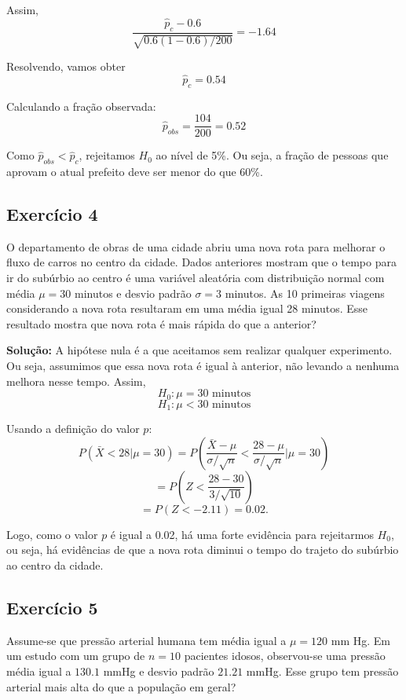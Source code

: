\documentclass{article}
\begin{document}
Assim,
    $$
    \frac{\hat{p}_c - 0.6}{\sqrt{0.6(1-0.6)/200}} = -1.64
    $$

Resolvendo, vamos obter 
    $$
    \hat{p}_c = 0.54
    $$
    
Calculando a fração observada:
    $$
    \hat{p}_{obs} = \frac{104}{200} = 0.52
    $$

Como $\hat{p}_{obs} < \hat{p}_c$, rejeitamos $H_0$ ao nível de 5\%. Ou seja, a fração de pessoas que aprovam o atual prefeito deve ser menor do que 60\%.

\subsection{Exercício 4}
O departamento de obras de uma cidade abriu uma nova rota para melhorar o fluxo de carros no centro da cidade. Dados anteriores mostram que o tempo para ir do subúrbio ao centro é uma variável aleatória com distribuição normal com média $\mu = 30$ minutos e desvio padrão $\sigma = 3$ minutos. As 10 primeiras viagens considerando a nova rota resultaram em uma média igual 28 minutos. Esse resultado mostra que nova rota é mais rápida do que a anterior?

\vspace{0.5cm}
\textbf{Solução:}
A hipótese nula é a que aceitamos sem realizar qualquer experimento. Ou seja, assumimos que essa nova rota é igual à anterior, não levando a nenhuma melhora nesse tempo. Assim,
    $$
    H_0: \mu = 30 \text{ minutos}
    $$
    $$
    H_1: \mu < 30 \text{ minutos}
    $$

Usando a definição do valor $p$:
    $$
    P(\bar{X} < 28 | \mu = 30) = P\left(\frac{\bar{X} - \mu}{\sigma / \sqrt{n}} < \frac{28 - \mu}{\sigma / \sqrt{n}} \Big| \mu = 30\right)
    $$
    $$
    = P\left(Z < \frac{28 - 30}{3 / \sqrt{10}}\right)
    $$
    $$
    = P(Z < -2.11) = 0.02.
    $$

Logo, como o valor $p$ é igual a 0.02, há uma forte evidência para rejeitarmos $H_0$, ou seja, há evidências de que a nova rota diminui o tempo do trajeto do subúrbio ao centro da cidade.

\subsection{Exercício 5}
Assume-se que pressão arterial humana tem média igual a $\mu = 120$ mm Hg. Em um estudo com um grupo de $n = 10$ pacientes idosos, observou-se uma pressão média igual a $130.1$ mmHg e desvio padrão $21.21$ mmHg. Esse grupo tem pressão arterial mais alta do que a população em geral?
\end{document}
